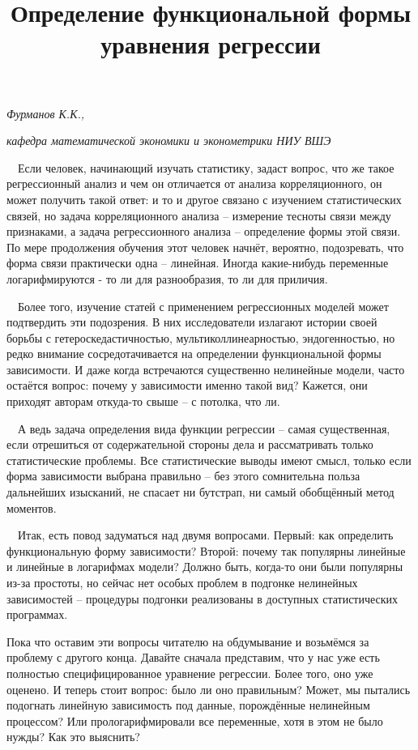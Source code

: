 \documentclass[a4paper]{article}
\title{Определение функциональной формы уравнения регрессии}
\begin{document}
\clearpage{}

{\raggedleft
\textit{Фурманов К.К.,}
\par}

{\raggedleft\itshape
кафедра математической экономики и эконометрики НИУ ВШЭ
\par}


\bigskip

\ \ Если человек, начинающий изучать статистику, задаст вопрос, что же такое регрессионный анализ и чем он отличается от анализа корреляционного, он может получить такой ответ: и то и другое связано с изучением статистических связей, но задача корреляционного анализа – измерение тесноты связи между признаками, а задача регрессионного анализа – определение формы этой связи. По мере продолжения обучения этот человек начнёт, вероятно, подозревать, что форма связи практически одна – линейная. Иногда какие-нибудь переменные логарифмируются - то ли для разнообразия, то ли для приличия.

\ \ Более того, изучение статей с применением регрессионных моделей может подтвердить эти подозрения. В них исследователи излагают истории своей борьбы с гетероскедастичностью, мультиколлинеарностью, эндогенностью, но редко внимание сосредотачивается на определении функциональной формы зависимости. И даже когда встречаются существенно нелинейные модели, часто остаётся вопрос: почему у зависимости именно такой вид? Кажется, они приходят авторам откуда-то свыше – с потолка, что ли.

\ \ А ведь задача определения вида функции регрессии – самая существенная, если отрешиться от содержательной стороны дела и рассматривать только статистические проблемы. Все статистические выводы имеют смысл, только если форма зависимости выбрана правильно – без этого сомнительна польза дальнейших изысканий, не спасает ни бутстрап, ни самый обобщённый метод моментов.

\ \ Итак, есть повод задуматься над двумя вопросами. Первый: как определить функциональную форму зависимости? Второй: почему так популярны линейные и линейные в логарифмах модели? Должно быть, когда-то они были популярны из-за простоты, но сейчас нет особых проблем в подгонке нелинейных зависимостей – процедуры подгонки реализованы в доступных статистических программах.

Пока что оставим эти вопросы читателю на обдумывание и возьмёмся за проблему с другого конца. Давайте сначала представим, что у нас уже есть полностью специфицированное уравнение регрессии. Более того, оно уже оценено. И теперь стоит вопрос: было ли оно правильным? Может, мы пытались подогнать линейную зависимость под данные, порождённые нелинейным процессом? Или прологарифмировали все переменные, хотя в этом не было нужды? Как это выяснить?
\end{document}
